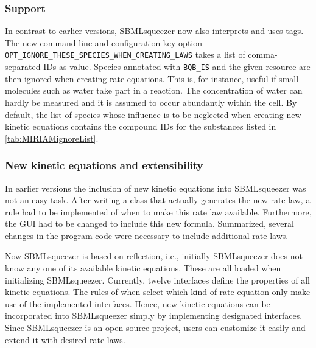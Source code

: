 \subsubsection{\MIRIAM Support}

In contrast to earlier versions, SBMLsqueezer now also interprets and uses
\MIRIAM tags. The new command-line and configuration key option
\verb!OPT_IGNORE_THESE_SPECIES_WHEN_CREATING_LAWS! takes a list of
comma-separated \MIRIAM \acp{ID} as value. Species annotated with
\verb!BQB_IS! and the given \MIRIAM resource are then ignored when creating rate
equations. This is, for instance, useful if small molecules such as water take
part in a reaction. The concentration of water can hardly be measured and it is
assumed to occur abundantly within the cell. By default, the list of species
whose influence is to be neglected when creating new kinetic equations contains
the \KEGG compound \acp{ID} for the substances listed in
\vref{tab:MIRIAMignoreList}.

\subsubsection{New kinetic equations and extensibility}

In earlier versions the inclusion of new kinetic equations into SBMLsqueezer was
not an easy task. After writing a class that actually generates the new rate
law, a rule had to be implemented of when to make this rate law available.
Furthermore, the GUI had to be changed to include this new formula. Summarized,
several changes in the program code were necessary to include additional rate
laws.

Now SBMLsqueezer is based on \Java reflection, i.e., initially SBMLsqueezer does
not know any one of its available kinetic equations. These are all loaded when
initializing SBMLsqueezer. Currently, twelve interfaces define the properties of
all kinetic equations. The rules of when select which kind of rate equation only
make use of the implemented interfaces. Hence, new kinetic equations can be
incorporated into SBMLsqueezer simply by implementing designated interfaces.
Since SBMLsqueezer is an open-source project, users can customize it easily and
extend it with desired rate laws.

